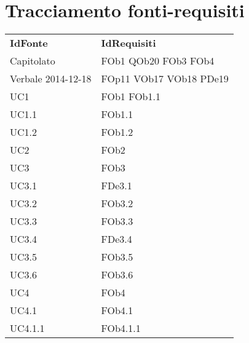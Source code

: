 \section{Tracciamento fonti-requisiti}
\begin{longtable}{|l|p{4cm}|}
\hline
\textbf{IdFonte} & \textbf{IdRequisiti} \\ 
Capitolato & FOb1 \linebreak  QOb20 \linebreak  FOb3 \linebreak  FOb4 \linebreak   \\ 
\hline
		Verbale 2014-12-18 & FOp11 \linebreak  VOb17 \linebreak  VOb18 \linebreak  PDe19 \linebreak   \\
\hline
		UC1 & FOb1 \linebreak  FOb1.1 \linebreak   \\
\hline
		UC1.1 & FOb1.1 \linebreak   \\
\hline
		UC1.2 & FOb1.2 \linebreak   \\
\hline
		UC2 & FOb2 \linebreak   \\
\hline
		UC3 & FOb3 \linebreak   \\
\hline
		UC3.1 & FDe3.1 \linebreak   \\
\hline
		UC3.2 & FOb3.2 \linebreak   \\
\hline
		UC3.3 & FOb3.3 \linebreak   \\
\hline
		UC3.4 & FDe3.4 \linebreak   \\
\hline
		UC3.5 & FOb3.5 \linebreak   \\
\hline
		UC3.6 & FOb3.6 \linebreak   \\
\hline
		UC4 & FOb4 \linebreak   \\
\hline
		UC4.1 & FOb4.1 \linebreak   \\
\hline
		UC4.1.1 & FOb4.1.1 \linebreak   \\

\end{longtable}

